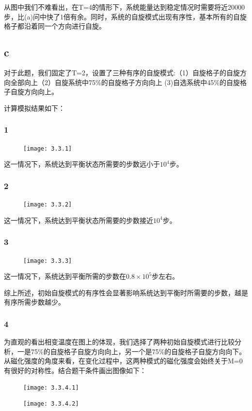 \documentclass[UTF8]{ctexart}
\begin{document}
    从图中我们不难看出，在T=4的情形下，系统能量达到稳定情况时需要将近20000步，比(a)问中快了1倍有余。同时，系统的自旋模式出现有序性，基本所有的自旋格子都沿着同一个方向进行自旋。

    \subsection{c}\label{subsec:3.3}
    对于此题，我们固定了T=2，设置了三种有序的自旋模式:（1）自旋格子的自旋方向全部向上（2）自旋系统中75\%的自旋格子方向向上 (3)自选系统中45\%的自旋格子自旋方向向上。

    \newpage
    计算模拟结果如下：
    \subsubsection{1}\label{subsubsec:3.3.1}
    \begin{figure}[h]
        \centering
        \texttt{[image: 3.3.1]}
        \label{fig:3.3.1}
    \end{figure}
    这一情况下，系统达到平衡状态所需要的步数远小于\(10^4\)步。

    \subsubsection{2}\label{subsubsec:3.3.2}
    \begin{figure}[h]
        \centering
        \texttt{[image: 3.3.2]}
        \label{fig:3.3.2}
    \end{figure}
    这一情况下，系统达到平衡状态所需要的步数接近\(10^4\)步。

    \subsubsection{3}\label{subsubsec:3.3.3}
    \begin{figure}[h]
        \centering
        \texttt{[image: 3.3.3]}
        \label{fig:3.3.3}
    \end{figure}

    这一情况下，系统达到平衡所需的步数在\(0.8\times10^5\)步左右。

    综上所述，初始自旋模式的有序性会显著影响系统达到平衡时所需要的步数，越是有序所需步数越少。

    \subsubsection{4}\label{subsubsec:3.3.4}
    为直观的看出相变温度在图上的体现，我们选择了两种初始自旋模式进行比较分析，一是75\%的自旋格子自旋方向向上，另一个是75\%的自旋格子自旋方向向下。从磁化强度的角度来看，在变化过程中，这两种模式的磁化强度会始终关于M=0有很好的对称性。结合题干条件画出图像如下：
    \begin{figure}[h]
        \centering
        \texttt{[image: 3.3.4.1]}
        \label{fig:3.3.4.1}
    \end{figure}
    \begin{figure}[h]
        \centering
        \texttt{[image: 3.3.4.2]}
        \label{fig:3.3.4.2}
    \end{figure}
\end{document}

